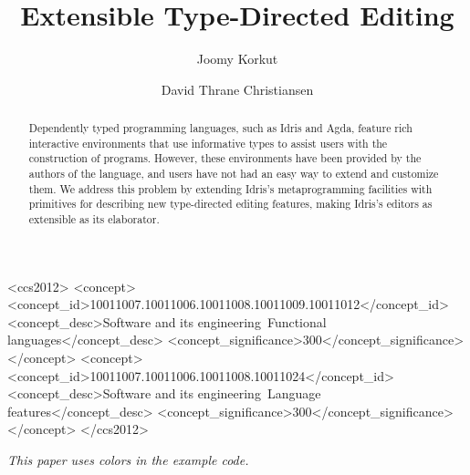 \documentclass[sigplan, screen]{acmart}
\begin{document}
\title[Extensible Type-Directed Editing]{Extensible Type-Directed Editing}


\author{Joomy Korkut}

\author{David Thrane Christiansen}


\renewcommand{\shortauthors}{Joomy Korkut and David Christiansen}

\begin{abstract}
  Dependently typed programming languages, such as Idris and Agda, feature rich interactive environments that use informative types to assist users with the construction of programs. However, these environments have been provided by the authors of the language, and users have not had an easy way to extend and customize them. We address this problem by extending Idris's metaprogramming facilities with primitives for describing new type-directed editing features, making Idris's editors as extensible as its elaborator.
\end{abstract}

%
%
 \begin{CCSXML}
<ccs2012>
<concept>
<concept_id>10011007.10011006.10011008.10011009.10011012</concept_id>
<concept_desc>Software and its engineering~Functional languages</concept_desc>
<concept_significance>300</concept_significance>
</concept>
<concept>
<concept_id>10011007.10011006.10011008.10011024</concept_id>
<concept_desc>Software and its engineering~Language features</concept_desc>
<concept_significance>300</concept_significance>
</concept>
</ccs2012>
\end{CCSXML}


\maketitle

\emph{This paper uses colors in the example code.}






\end{document}
